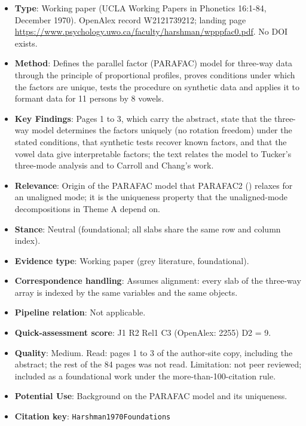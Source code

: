 \documentclass[journal,onecolumn]{IEEEtran}
\begin{document}
\begin{itemize}

\item{} \textbf{Type}: Working paper (UCLA Working Papers in Phonetics 16:1-84, December 1970). OpenAlex record W2121739212; landing page \url{https://www.psychology.uwo.ca/faculty/harshman/wpppfac0.pdf}. No DOI exists.

\item{} \textbf{Method}: Defines the parallel factor (PARAFAC) model for three-way data through the principle of proportional profiles, proves conditions under which the factors are unique, tests the procedure on synthetic data and applies it to formant data for 11 persons by 8 vowels.

\item{} \textbf{Key Findings}: Pages 1 to 3, which carry the abstract, state that the three-way model determines the factors uniquely (no rotation freedom) under the stated conditions, that synthetic tests recover known factors, and that the vowel data give interpretable factors; the text relates the model to Tucker's three-mode analysis and to Carroll and Chang's work.

\item{} \textbf{Relevance}: Origin of the PARAFAC model that PARAFAC2 (\cite{Kiers1999PARAFAC2}) relaxes for an unaligned mode; it is the uniqueness property that the unaligned-mode decompositions in Theme A depend on.

\item{} \textbf{Stance}: Neutral (foundational; all slabs share the same row and column index).

\item{} \textbf{Evidence type}: Working paper (grey literature, foundational).

\item{} \textbf{Correspondence handling}: Assumes alignment: every slab of the three-way array is indexed by the same variables and the same objects.

\item{} \textbf{Pipeline relation}: Not applicable.

\item{} \textbf{Quick-assessment score}: J1 R2 Rel1 C3 (OpenAlex: 2255) D2 = 9.

\item{} \textbf{Quality}: Medium. Read: pages 1 to 3 of the author-site copy, including the abstract; the rest of the 84 pages was not read. Limitation: not peer reviewed; included as a foundational work under the more-than-100-citation rule.

\item{} \textbf{Potential Use}: Background on the PARAFAC model and its uniqueness.

\item{} \textbf{Citation key}: \texttt{Harshman1970Foundations}

\end{itemize}
\end{document}
